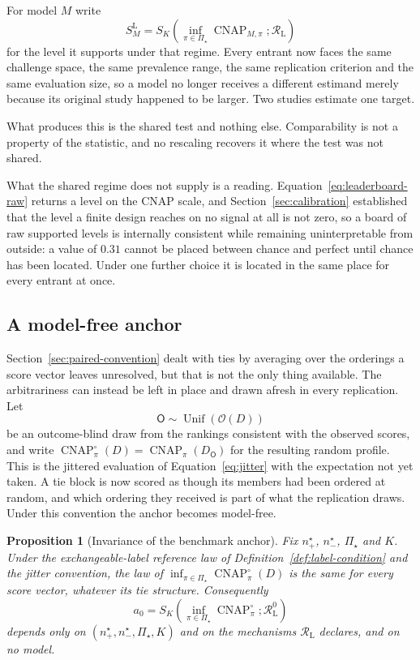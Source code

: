 \documentclass[11pt]{article}
\newcommand{\CNAP}{\operatorname{CNAP}}
\newcommand{\Regime}{\mathcal{R}}
\newcommand{\PSet}{\Pi_\star}
\newcommand{\Rank}{\mathsf{O}}
\newcommand{\CNAPj}{\CNAP^{\circ}}
\newcommand{\RegimeL}{\Regime_{\mathrm{L}}}
\newcommand{\SLead}{S^{\mathrm{L}}}
\newcommand{\Unif}{\operatorname{Unif}}
\newtheorem{proposition}{Proposition}
\theoremstyle{remark}
\begin{document}
For model $M$ write
\begin{equation}
\SLead_M
=
S_K
\left(
\inf_{\pi\in\PSet}\CNAP_{M,\pi};
\RegimeL
\right)
\label{eq:leaderboard-raw}
\end{equation}
for the level it supports under that regime. Every entrant now faces the same challenge space, the same prevalence range, the same replication criterion and the same evaluation size, so a model no longer receives a different estimand merely because its original study happened to be larger. Two studies estimate one target.

What produces this is the shared test and nothing else. Comparability is not a property of the statistic, and no rescaling recovers it where the test was not shared.

What the shared regime does not supply is a reading. Equation~\eqref{eq:leaderboard-raw} returns a level on the CNAP scale, and Section~\ref{sec:calibration} established that the level a finite design reaches on no signal at all is not zero, so a board of raw supported levels is internally consistent while remaining uninterpretable from outside: a value of $0.31$ cannot be placed between chance and perfect until chance has been located. Under one further choice it is located in the same place for every entrant at once.

\subsection{A model-free anchor}
\label{sec:common-anchor}

Section~\ref{sec:paired-convention} dealt with ties by averaging over the orderings a score vector leaves unresolved, but that is not the only thing available. The arbitrariness can instead be left in place and drawn afresh in every replication. Let
\[
\Rank\sim\Unif\left(\mathcal{O}(D)\right)
\]
be an outcome-blind draw from the rankings consistent with the observed scores, and write $\CNAPj_\pi(D)=\CNAP_\pi(D_{\Rank})$ for the resulting random profile. This is the jittered evaluation of Equation~\eqref{eq:jitter} with the expectation not yet taken. A tie block is now scored as though its members had been ordered at random, and which ordering they received is part of what the replication draws. Under this convention the anchor becomes model-free.

\begin{proposition}[Invariance of the benchmark anchor]
\label{prop:anchor-invariance}
Fix $n^\star_+$, $n^\star_-$, $\PSet$ and $K$. Under the exchangeable-label reference law of Definition~\ref{def:label-condition} and the jitter convention, the law of $\inf_{\pi\in\PSet}\CNAPj_\pi(D)$ is the same for every score vector, whatever its tie structure. Consequently
\begin{equation}
a_0
=
S_K
\left(
\inf_{\pi\in\PSet}\CNAPj_\pi;
\RegimeL^{0}
\right)
\label{eq:common-anchor}
\end{equation}
depends only on $(n^\star_+,n^\star_-,\PSet,K)$ and on the mechanisms $\RegimeL$ declares, and on no model.
\end{proposition}
\end{document}
